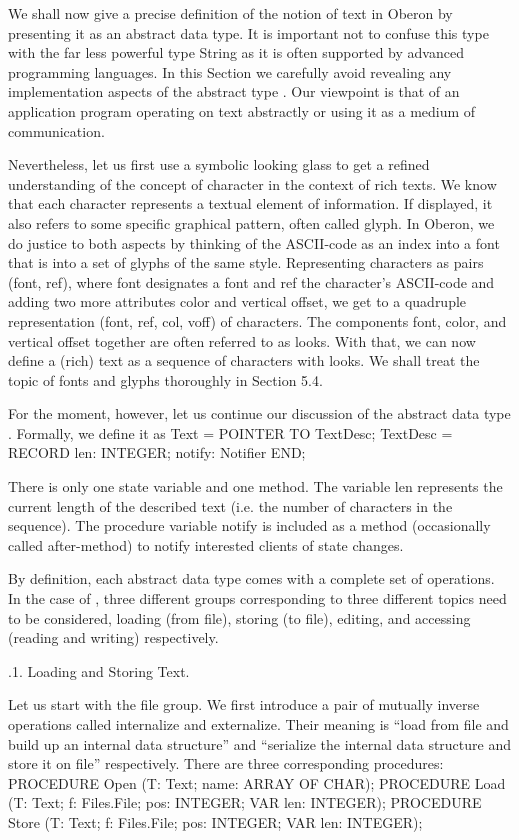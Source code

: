 We shall now give a precise definition of the notion of text in Oberon
by presenting it as an abstract data type. It is important not to
confuse this type with the far less powerful type String as it is
often supported by advanced programming languages. In this Section we
carefully avoid revealing any implementation aspects of the abstract
type . Our viewpoint is that of an application program operating
on text abstractly or using it as a medium of communication.

Nevertheless, let us first use a symbolic looking glass to get a
refined understanding of the concept of character in the context of
rich texts. We know that each character represents a textual element
of information. If displayed, it also refers to some specific
graphical pattern, often called glyph. In Oberon, we do justice to
both aspects by thinking of the ASCII-code as an index into a font
that is into a set of glyphs of the same style. Representing
characters as pairs (font, ref), where font designates a font and ref
the character's ASCII-code and adding two more attributes color and
vertical offset, we get to a quadruple representation (font, ref, col,
voff) of characters. The components font, color, and vertical offset
together are often referred to as looks. With that, we can now define
a (rich) text as a sequence of characters with looks. We shall treat
the topic of fonts and glyphs thoroughly in Section 5.4.

For the moment, however, let us continue our discussion of the
abstract data type . Formally, we define it as
\begintt
Text = POINTER TO TextDesc;
TextDesc = RECORD
  len: INTEGER;
  notify: Notifier
END;
\endtt

\noindent There is only one state variable and one method. The variable len
represents the current length of the described text (i.e. the number
of characters in the sequence). The procedure variable notify is
included as a method (occasionally called after-method) to notify
interested clients of state changes.

By definition, each abstract data type comes with a complete set of
operations. In the case of , three different groups corresponding
to three different topics need to be considered, loading (from file),
storing (to file), editing, and accessing (reading and writing)
respectively.

.1. Loading and Storing Text.

Let us start with the file group. We first introduce a pair of
mutually inverse operations called internalize and externalize. Their
meaning is ``load from file and build up an internal data structure''
and ``serialize the internal data structure and store it on file''
respectively. There are three corresponding procedures:
\begintt
PROCEDURE Open (T: Text; name: ARRAY OF CHAR);
PROCEDURE Load (T: Text; f: Files.File; pos: INTEGER; VAR len: INTEGER);
PROCEDURE Store (T: Text; f: Files.File; pos: INTEGER; VAR len: INTEGER);
\endtt

